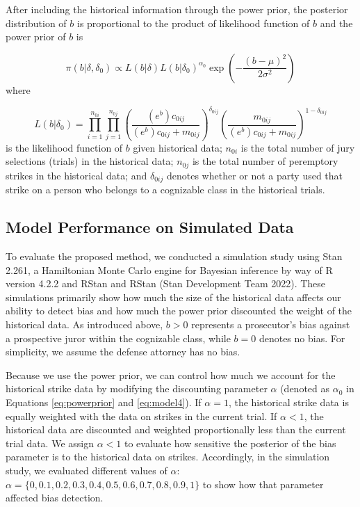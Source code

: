 \documentclass[12pt]{article}
\begin{document}
After including the historical information through the power prior, the posterior distribution of \(b\) is proportional to the product of likelihood function of \(b\) and the power prior of \(b\) is

\begin{equation}
 \pi(b|\delta,\delta_0) \propto L(b|\delta)L(b|\delta_0)^{\alpha_0}\exp\left(-\frac{(b-\mu)^2}{2\sigma^2}\right)
  \label{eq:model4}
\end{equation} where

\begin{equation}
L(b|\delta_0) = \prod_{i=1}^{n_{0i}} \prod_{j=1}^{n_{0j}}\left(\frac{(e^b)c_{0ij}}{(e^b)c_{0ij}+m_{0ij}}\right)^{\delta_{0ij}} \left(\frac{m_{0ij}}{(e^b)c_{0ij}+m_{0ij}}\right)^{1-\delta_{0ij}}
\label{eq:model5}
\end{equation} is the likelihood function of \(b\) given historical data; \(n_{0i}\) is the total number of jury selections (trials) in the historical data; \(n_{0j}\) is the total number of peremptory strikes in the historical data; and \(\delta_{0ij}\) denotes whether or not a party used that strike on a person who belongs to a cognizable class in the historical trials.

\hypertarget{simulation-results}{%
\subsection{Model Performance on Simulated Data}\label{simulation-results}}

To evaluate the proposed method, we conducted a simulation study using Stan 2.261, a Hamiltonian Monte Carlo engine for Bayesian inference by way of R version 4.2.2 and RStan and RStan (Stan Development Team 2022). These simulations primarily show how much the size of the historical data affects our ability to detect bias and how much the power prior discounted the weight of the historical data. As introduced above, \(b > 0\) represents a prosecutor's bias against a prospective juror within the cognizable class, while \(b = 0\) denotes no bias. For simplicity, we assume the defense attorney has no bias.

Because we use the power prior, we can control how much we account for the historical strike data by modifying the discounting parameter \(\alpha\) (denoted as \(\alpha_0\) in Equations \eqref{eq:powerprior} and \eqref{eq:model4}). If \(\alpha=1\), the historical strike data is equally weighted with the data on strikes in the current trial. If \(\alpha<1\), the historical data are discounted and weighted proportionally less than the current trial data. We assign \(\alpha<1\) to evaluate how sensitive the posterior of the bias parameter is to the historical data on strikes. Accordingly, in the simulation study, we evaluated different values of \(\alpha\): \(\alpha=\{0,0.1,0.2,0.3,0.4,0.5,0.6,0.7,0.8,0.9,1\}\) to show how that parameter affected bias detection.
\end{document}
